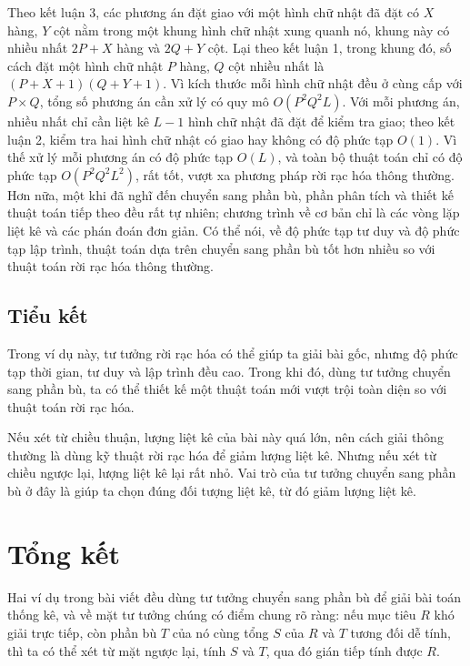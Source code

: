 \documentclass[11pt]{article}
\begin{document}
Theo kết luận 3, các phương án đặt giao với một hình chữ nhật đã đặt có
\(X\) hàng, \(Y\) cột nằm trong một khung hình chữ nhật xung quanh nó,
khung này có nhiều nhất \(2P+X\) hàng và \(2Q+Y\) cột. Lại theo kết luận
1, trong khung đó, số cách đặt một hình chữ nhật \(P\) hàng, \(Q\) cột
nhiều nhất là \((P+X+1)(Q+Y+1)\). Vì kích thước mỗi hình chữ nhật đều ở
cùng cấp với \(P\times Q\), tổng số phương án cần xử lý có quy mô
\(O(P^2Q^2L)\). Với mỗi phương án, nhiều nhất chỉ cần liệt kê \(L-1\)
hình chữ nhật đã đặt để kiểm tra giao; theo kết luận 2, kiểm tra hai hình
chữ nhật có giao hay không có độ phức tạp \(O(1)\). Vì thế xử lý mỗi
phương án có độ phức tạp \(O(L)\), và toàn bộ thuật toán chỉ có độ phức
tạp \(O(P^2Q^2L^2)\), rất tốt, vượt xa phương pháp rời rạc hóa thông
thường. Hơn nữa, một khi đã nghĩ đến chuyển sang phần bù, phần phân tích
và thiết kế thuật toán tiếp theo đều rất tự nhiên; chương trình về cơ bản
chỉ là các vòng lặp liệt kê và các phán đoán đơn giản. Có thể nói, về độ
phức tạp tư duy và độ phức tạp lập trình, thuật toán dựa trên chuyển sang
phần bù tốt hơn nhiều so với thuật toán rời rạc hóa thông thường.

\subsection{Tiểu kết}

Trong ví dụ này, tư tưởng rời rạc hóa có thể giúp ta giải bài gốc, nhưng
độ phức tạp thời gian, tư duy và lập trình đều cao. Trong khi đó, dùng tư
tưởng chuyển sang phần bù, ta có thể thiết kế một thuật toán mới vượt
trội toàn diện so với thuật toán rời rạc hóa.

Nếu xét từ chiều thuận, lượng liệt kê của bài này quá lớn, nên cách giải
thông thường là dùng kỹ thuật rời rạc hóa để giảm lượng liệt kê. Nhưng
nếu xét từ chiều ngược lại, lượng liệt kê lại rất nhỏ. Vai trò của tư
tưởng chuyển sang phần bù ở đây là giúp ta chọn đúng đối tượng liệt kê,
từ đó giảm lượng liệt kê.

\section{Tổng kết}

Hai ví dụ trong bài viết đều dùng tư tưởng chuyển sang phần bù để giải
bài toán thống kê, và về mặt tư tưởng chúng có điểm chung rõ ràng: nếu
mục tiêu \(R\) khó giải trực tiếp, còn phần bù \(T\) của nó cùng tổng
\(S\) của \(R\) và \(T\) tương đối dễ tính, thì ta có thể xét từ mặt
ngược lại, tính \(S\) và \(T\), qua đó gián tiếp tính được \(R\).
\end{document}
